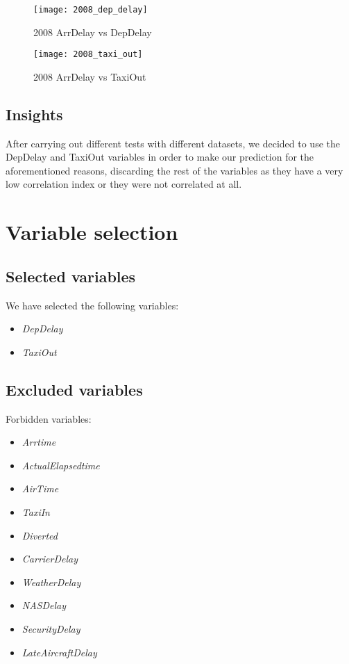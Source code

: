 \begin{figure}[H]
	\centering
	\begin{minipage}{.45\textwidth}
		\centering
		\texttt{[image: 2008\_dep\_delay]}
		\caption{2008 ArrDelay vs DepDelay}
		\label{fig:2008_dep_delay}
	\end{minipage}\hfill
	\begin{minipage}{.45\textwidth}
		\centering
		\texttt{[image: 2008\_taxi\_out]}
		\caption{2008 ArrDelay vs TaxiOut}
		\label{fig:2008_taxi_out}
	\end{minipage}
\end{figure}

\subsection{Insights}
After carrying out different tests with different datasets, we decided to use the DepDelay and TaxiOut variables in order to make our prediction for the aforementioned reasons, discarding the rest of the variables as they have a very low correlation index or they were not correlated at all.

\section{Variable selection}

\subsection{Selected variables}
We have selected the following variables:

\begin{itemize}
	\item \textit{DepDelay}
	\item \textit{TaxiOut}
\end{itemize}

\subsection{Excluded variables}
Forbidden variables:

\begin{itemize}
	\item \textit{Arrtime}
	\item \textit{ActualElapsedtime}
	\item \textit{AirTime}
	\item \textit{TaxiIn}
	\item \textit{Diverted}
	\item \textit{CarrierDelay}
	\item \textit{WeatherDelay}
	\item \textit{NASDelay}
	\item \textit{SecurityDelay}
	\item \textit{LateAircraftDelay}
\end{itemize}


